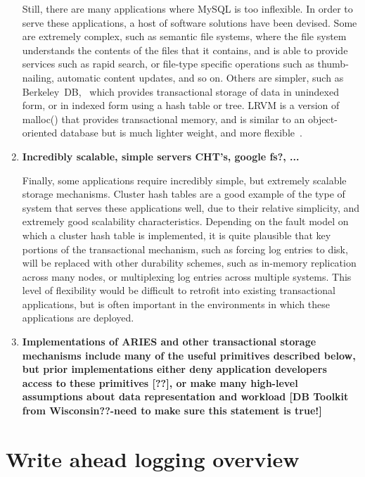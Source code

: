 \documentclass[letterpaper,twocolumn,english]{article}
\begin{document}
\begin{enumerate}
Still, there are many applications where MySQL is too inflexible.  In
order to serve these applications, a host of software solutions have
been devised.  Some are extremely complex, such as semantic file
systems, where the file system understands the contents of the files
that it contains, and is able to provide services such as rapid
search, or file-type specific operations such as thumb-nailing,
automatic content updates, and so on.  Others are simpler, such as
Berkeley~DB,~\cite{berkeleyDB, bdb} which provides transactional
storage of data in unindexed form, or in indexed form using a hash
table or tree.  LRVM is a version of malloc() that provides
transactional memory, and is similar to an object-oriented database
but is much lighter weight, and more flexible~\cite{lrvm}.

  \item {\bf Incredibly scalable, simple servers CHT's, google fs?, ...}

Finally, some applications require incredibly simple, but extremely
scalable storage mechanisms.  Cluster hash tables are a good example
of the type of system that serves these applications well, due to
their relative simplicity, and extremely good scalability
characteristics.  Depending on the fault model on which a cluster hash
table is implemented, it is quite plausible that key portions of the
transactional mechanism, such as forcing log entries to disk, will be
replaced with other durability schemes, such as in-memory replication
across many nodes, or multiplexing log entries across multiple
systems.  This level of flexibility would be difficult to retrofit
into existing transactional applications, but is often important in
the environments in which these applications are deployed.


  \item {\bf Implementations of ARIES and other transactional storage
  mechanisms include many of the useful primitives described below,
  but prior implementations either deny application developers access
  to these primitives {[}??{]}, or make many high-level assumptions
  about data representation and workload {[}DB Toolkit from
  Wisconsin??-need to make sure this statement is true!{]}}

\end{enumerate}


\section{Write ahead logging overview}
\end{document}
